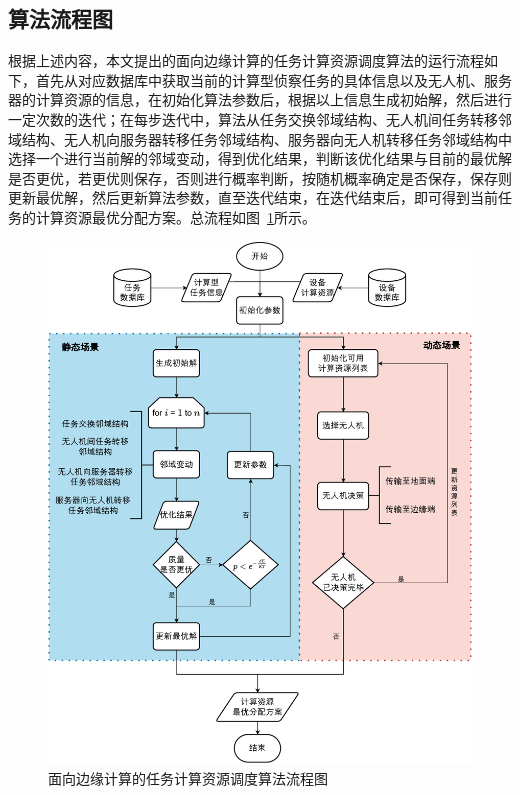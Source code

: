 \subsection{算法流程图}

根据上述内容，本文提出的面向边缘计算的任务计算资源调度算法的运行流程如下，首先从对应数据库中获取当前的计算型侦察任务的具体信息以及无人机、服务器的计算资源的信息，在初始化算法参数后，根据以上信息生成初始解，然后进行一定次数的迭代；在每步迭代中，算法从任务交换邻域结构、无人机间任务转移邻域结构、无人机向服务器转移任务邻域结构、服务器向无人机转移任务邻域结构中选择一个进行当前解的邻域变动，得到优化结果，判断该优化结果与目前的最优解是否更优，若更优则保存，否则进行概率判断，按随机概率确定是否保存，保存则更新最优解，然后更新算法参数，直至迭代结束，在迭代结束后，即可得到当前任务的计算资源最优分配方案。总流程如图~\ref{fig:基于边缘计算的任务资源调度算法流程图}所示。

\begin{figure}[!htbp]
    \centering
    \includegraphics[width=\textwidth]{images/基于边缘计算的任务资源调度算法流程图.pdf}
    \caption{面向边缘计算的任务计算资源调度算法流程图}
    \label{fig:基于边缘计算的任务资源调度算法流程图}
\end{figure}

